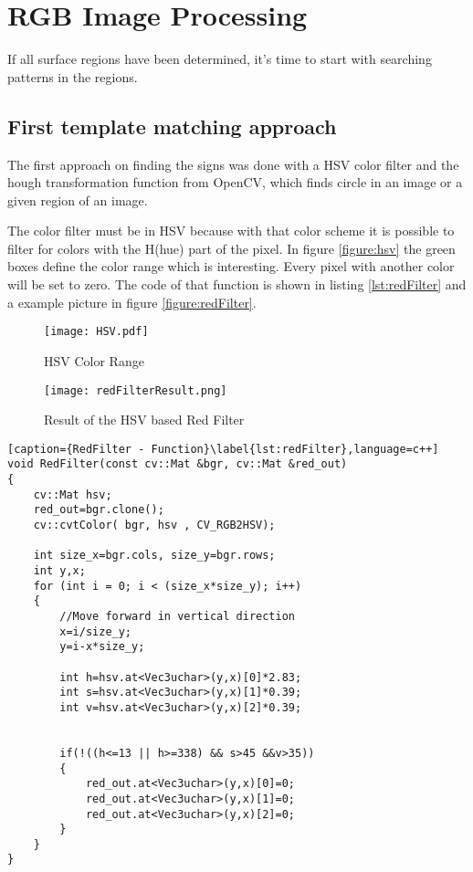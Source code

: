 \section{RGB Image Processing}



If all surface regions have been determined, it's time to start with searching patterns in the
regions. 

\subsection{First template matching approach}
The first approach on finding the signs was done with a HSV color filter and the hough transformation
function from OpenCV, which finds circle in an image or a given region of an image.

The color filter must be in HSV because with that color scheme it is possible to filter for colors
with the H(hue) part of the pixel. In figure \vref{figure:hsv} the green boxes define the color range
which is interesting. Every pixel with another color will be set to zero. The code of that function is
shown in listing \vref{lst:redFilter} and a example picture in figure \vref{figure:redFilter}.

\begin{figure}[htp]
\begin{center}
  \texttt{[image: HSV.pdf]}
  \caption{HSV Color Range}
  \label{figure:hsv}
\end{center}
\end{figure}


\begin{figure}[htp]
\begin{center}
  \texttt{[image: redFilterResult.png]}
  \caption{Result of the HSV based Red Filter}
  \label{figure:redFilter}
\end{center}
\end{figure}


\begin{lstlisting}[caption={RedFilter - Function}\label{lst:redFilter},language=c++]
void RedFilter(const cv::Mat &bgr, cv::Mat &red_out)
{
	cv::Mat hsv;
	red_out=bgr.clone();
	cv::cvtColor( bgr, hsv , CV_RGB2HSV);

	int size_x=bgr.cols, size_y=bgr.rows;
	int y,x;
	for (int i = 0; i < (size_x*size_y); i++)
	{
		//Move forward in vertical direction
		x=i/size_y;
		y=i-x*size_y;

		int h=hsv.at<Vec3uchar>(y,x)[0]*2.83;
		int s=hsv.at<Vec3uchar>(y,x)[1]*0.39;
		int v=hsv.at<Vec3uchar>(y,x)[2]*0.39;


		if(!((h<=13 || h>=338) && s>45 &&v>35))
		{
			red_out.at<Vec3uchar>(y,x)[0]=0;
			red_out.at<Vec3uchar>(y,x)[1]=0;
			red_out.at<Vec3uchar>(y,x)[2]=0;
		}
	}
}
\end{lstlisting}

